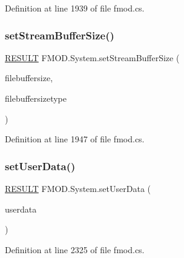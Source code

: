 Definition at line 1939 of file fmod.\+cs.

\mbox{\label{class_f_m_o_d_1_1_system_a0300ff1040401d2ce49d4766b733ddcb}} 
\subsubsection{\texorpdfstring{set\+Stream\+Buffer\+Size()}{setStreamBufferSize()}}
{\footnotesize\ttfamily \hyperlink{namespace_f_m_o_d_a305d1176ef3f8c8815861a60407ac33d}{R\+E\+S\+U\+LT} F\+M\+O\+D.\+System.\+set\+Stream\+Buffer\+Size (\begin{DoxyParamCaption}\item[{uint}]{filebuffersize,  }\item[{\hyperlink{namespace_f_m_o_d_aff20975332f93ff2180d2681cb43929f}{T\+I\+M\+E\+U\+N\+IT}}]{filebuffersizetype }\end{DoxyParamCaption})}



Definition at line 1947 of file fmod.\+cs.

\mbox{\label{class_f_m_o_d_1_1_system_a5d9c5a00bef3a9e8326104ef2aceab21}} 
\subsubsection{\texorpdfstring{set\+User\+Data()}{setUserData()}}
{\footnotesize\ttfamily \hyperlink{namespace_f_m_o_d_a305d1176ef3f8c8815861a60407ac33d}{R\+E\+S\+U\+LT} F\+M\+O\+D.\+System.\+set\+User\+Data (\begin{DoxyParamCaption}\item[{Int\+Ptr}]{userdata }\end{DoxyParamCaption})}



Definition at line 2325 of file fmod.\+cs.

\mbox{\label{class_f_m_o_d_1_1_system_a2b43846b4153b5351616e62d556321e9}} 
